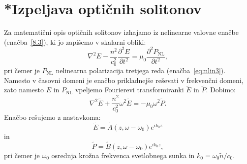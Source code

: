 \section{*Izpeljava optičnih solitonov}
Za matematični opis optičnih solitonov izhajamo iz nelinearne 
valovne enačbe (enačba~\ref{8.3}), ki jo zapišemo v skalarni obliki:
\begin{equation}
\nabla^{2}E-\frac{n^2}{c_0^{2}}{\frac{\partial^2 E}{\partial t^2}}=
\mu_{0}{\frac{\partial^2P_{\textrm{NL}}}{\partial t^2}},
\end{equation}
pri čemer je 
$P_\textrm{NL}$ nelinearna polarizacija tretjega reda (enačba~\ref{eq:nlin3}).
Namesto v časovni domeni je enačbo prikladnejše reševati v frekvenčni domeni, zato
namesto $E$ in $P_{\mathrm{NL}}$ vpeljemo Fourierevi transformiranki
$\tilde{E}$ in $\tilde{P}$. Dobimo:
\begin{equation}
\nabla^{2}\tilde{E}+\frac{n^2}{c_0^{2}}\omega^2 \tilde{E}=
- \mu_{0}\omega^2 \tilde{P}.
\label{eq:soleq1}
\end{equation}
Enačbo rešujemo z nastavkoma:
\begin{equation}
\tilde{E} = \tilde{A} (z,\omega - \omega_0) e^{ik_0z}
\end{equation}
in 
\begin{equation}
 \tilde{P} = \tilde{B} (z,\omega - \omega_0) e^{ik_0z},
\end{equation}
pri čemer je $\omega_0$ osrednja krožna frekvenca svetlobnega sunka in $k_0 = \omega_0 \tilde{n}/c_0$.

